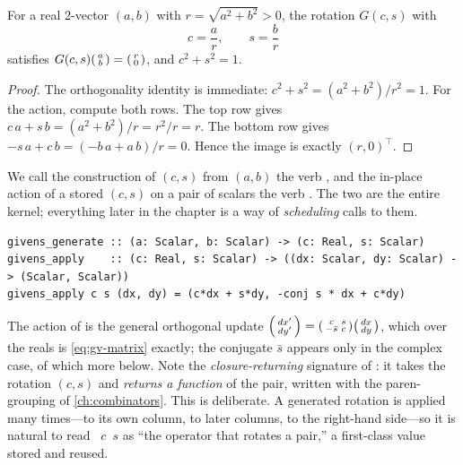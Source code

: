 \begin{lemma}
\label{lem:gv-generate}
For a real 2-vector $(a,b)$ with $r = \sqrt{a^2 + b^2} > 0$, the rotation $G(c,s)$
with
\begin{equation}
\label{eq:gv-cs}
  c = \frac{a}{r}, \qquad s = \frac{b}{r}
\end{equation}
satisfies $G(c,s)\begin{psmallmatrix} a \\ b \end{psmallmatrix} =
\begin{psmallmatrix} r \\ 0 \end{psmallmatrix}$, and $c^2 + s^2 = 1$.
\end{lemma}

\begin{proof}
The orthogonality identity is immediate: $c^2 + s^2 = (a^2 + b^2)/r^2 = 1$. For the
action, compute both rows. The top row gives $c\,a + s\,b = (a^2 + b^2)/r = r^2/r = r$.
The bottom row gives $-s\,a + c\,b = (-b\,a + a\,b)/r = 0$. Hence the image is exactly
$(r,0)^{\!\top}$.
\end{proof}

We call the construction of $(c,s)$ from $(a,b)$ the verb , and
the in-place action of a stored $(c,s)$ on a pair of scalars the verb
. The two are the entire kernel; everything later in the chapter is
a way of \emph{scheduling} calls to them.

\begin{lstlisting}[style=l4style]
givens_generate :: (a: Scalar, b: Scalar) -> (c: Real, s: Scalar)
givens_apply    :: (c: Real, s: Scalar) -> ((dx: Scalar, dy: Scalar) -> (Scalar, Scalar))
givens_apply c s (dx, dy) = (c*dx + s*dy, -conj s * dx + c*dy)
\end{lstlisting}

The action of  is the general orthogonal update $\begin{psmallmatrix}
dx' \\ dy' \end{psmallmatrix} = \begin{psmallmatrix} c & s \\ -\bar s & c
\end{psmallmatrix}\begin{psmallmatrix} dx \\ dy \end{psmallmatrix}$, which over the
reals is \cref{eq:gv-matrix} exactly; the conjugate $\bar s$ appears only in the
complex case, of which more below. Note the \emph{closure-returning} signature of
: it takes the rotation $(c,s)$ and \emph{returns a function} of the
pair, written with the paren-grouping of \cref{ch:combinators}. This is deliberate. A
generated rotation is applied many times---to its own column, to later columns, to the
right-hand side---so it is natural to read ~$c$~$s$ as ``the
operator that rotates a pair,'' a first-class value stored and reused.


